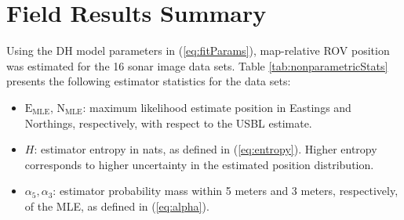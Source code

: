 \section{Field Results Summary}
\label{rov.Summary}

Using the DH model parameters in (\ref{eq:fitParams}), map-relative ROV position was estimated for the 16 sonar image data sets.
Table \ref{tab:nonparametricStats} presents the following estimator statistics for the data sets:

\begin{itemize}
\item $\text{E}_\textrm{MLE}$, $\text{N}_\textrm{MLE}$: maximum likelihood estimate position in Eastings and Northings, respectively, with respect to the USBL estimate.
\item $H$: estimator entropy in nats, as defined in (\ref{eq:entropy}). Higher entropy corresponds to higher uncertainty in the estimated position distribution.
\item $\alpha_5, \alpha_3$: estimator probability mass within 5 meters and 3 meters, respectively, of the MLE, as defined in (\ref{eq:alpha}).
\end{itemize}

